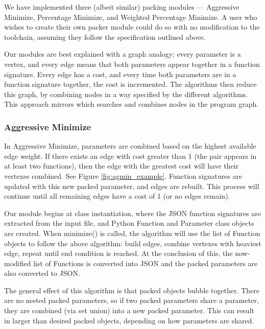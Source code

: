 \documentclass{article}
\begin{document}
We have implemented three (albeit similar) packing modules --- Aggressive Minimize, Percentage Minimize, and Weighted Percentage Minimize. A user who wishes to create their own packer module could do so with no modification to the toolchain, assuming they follow the specification outlined above.

Our modules are best explained with a graph analogy; every parameter is a vertex, and every edge means that both parameters appear together in a function signature. Every edge has a cost, and every time both parameters are in a function signature together, the cost is incremented. The algorithms then reduce this graph, by combining nodes in a way specified by the different algorithms. This approach mirrors \cite{6178876} which searches and combines nodes in the program graph.

\subsubsection{Aggressive Minimize}

\noindent  

In Aggressive Minimize, parameters are combined based on the highest available edge weight. If there exists an edge with cost greater than 1 (the pair appears in at least two functions), then the edge with the greatest cost will have their vertexes combined. See Figure \ref{fig:agmin_example}. Function signatures are updated with this new packed parameter, and edges are rebuilt. This process will continue until all remaining edges have a cost of 1 (or no edges remain).

Our module begins at class instantiation, where the JSON function signatures are extracted from the input file, and Python Function and Parameter class objects are created. When minimize() is called, the algorithm will use the list of Function objects to follow the above algorithm: build edges, combine vertexes with heaviest edge, repeat until end condition is reached. At the conclusion of this, the now-modified list of Functions is converted into JSON and the packed parameters are also converted to JSON.

The general effect of this algorithm is that packed objects bubble together. There are no nested packed parameters, so if two packed parameters share a parameter, they are combined (via set union) into a new packed parameter. This can result in larger than desired packed objects, depending on how parameters are shared.
\end{document}
